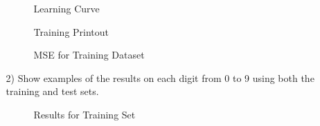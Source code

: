 \documentclass[fleqn]{article}
\begin{document}
\begin{enumerate}
\begin{enumerate}
			\begin{figure}[H]
				\centerline{}
				\caption{Learning Curve}
				\label{learning_curve}
			\end{figure}
			
			\begin{figure}[H]
				\centerline{}
				\caption{Training Printout}
				\label{training_printout}
			\end{figure}
			
			\begin{figure}[H]
				\centerline{}
				\caption{MSE for Training Dataset}
				\label{training_mse}
			\end{figure}
			
			\pagebreak
			\item[2)] Show examples of the results on each digit from 0 to 9 using both the training and test sets.
			
			\begin{figure}[H]
				\centerline{}
				\caption{Results for Training Set}
				\label{training_results}
			\end{figure}
			

\end{enumerate}
\end{enumerate}
\end{document}

